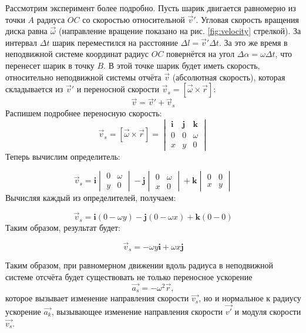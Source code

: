 Рассмотрим эксперимент более подробно. 
Пусть шарик двигается равномерно из точки $A$ радиуса $OC$ со скоростью относительной $\vec{v}'$. 
Угловая скорость вращения диска равна $\vec{\omega} $ (направление вращение показано на рис. \ref{fig:velocity} стрелкой). 
За интервал $\Delta t$ шарик переместился на расстояние $\Delta l = \vec{v}' \Delta t $. 
За это же время в неподвижной системе координат радиус $OC$ повернётся на угол $\Delta \alpha = \omega \Delta t$, что перенесет шарик в точку $B$. 
В этой точке шарик будет иметь скорость, относительно неподвижной системы отчёта $\vec{v}$ (абсолютная скорость), которая складывается из $\vec{v}'$  и  переносной скорости $\vec{v}_s = [\vec{\omega} \times \vec{r}]$:
\begin{equation}
	\vec{v} = \vec{v}' + \vec{v}_s
	\label{eq:velocity}
\end{equation}
Распишем подробнее переносную скорость:
\[
\vec{v}_s = [\vec{\omega} \times \vec{r}] = \begin{vmatrix}
	\mathbf{i} & \mathbf{j} & \mathbf{k} \\
	0 & 0 & \omega \\
	x & y &  0
\end{vmatrix}
\]
Теперь вычислим определитель:

\[
\vec{v}_s = \mathbf{i} \begin{vmatrix}
	0 & \omega \\
	y & 0
\end{vmatrix} - \mathbf{j} \begin{vmatrix}
	0 & \omega \\
	x & 0
\end{vmatrix} + \mathbf{k} \begin{vmatrix}
	0 & 0 \\
	x & y
\end{vmatrix}
\]
Вычисляя каждый из определителей, получаем:

\[
\vec{v}_s = \mathbf{i} (0 - \omega y) - \mathbf{j} (0 - \omega x) + \mathbf{k} (0 - 0)
\]
Таким образом, результат будет:

\[
\vec{v}_s = -\omega y \mathbf{i} + \omega x \mathbf{j}
\]

Таким образом, при равномерном движении вдоль радиуса в неподвижной системе отсчёта будет существовать не только переносное ускорение 
\[
\vec{a_s} = -\omega^2 \vec{r},
\]
которое вызывает изменение направления скорости \(\vec{v_s}\), но и нормальное к радиусу ускорение \(\vec{a_k}\), вызывающее изменение направления скорости \(\vec{v'}\) и модуля скорости \(\vec{v_s}\).

